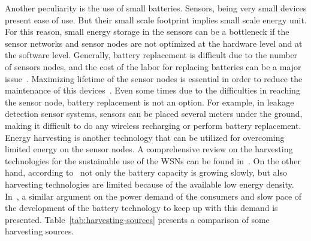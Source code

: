 \documentclass[12pt, oneandhalf, chaparabic, sees, ms]{metu}
\begin{document}
Another peculiarity is the use of small batteries.
Sensors, being very small devices present ease of use. But their small scale footprint implies small scale energy unit.
For this reason, small energy storage in the sensors can be a bottleneck if the sensor networks and sensor nodes are not optimized
at the hardware level and at the software level. Generally, battery replacement is difficult due to the number of sensors nodes, 
and the cost of the labor for replacing batteries can be a major issue~\cite{callaway2004}.
Maximizing lifetime of the sensor nodes is essential in order to reduce the maintenance of this devices~\cite[p.~13]{shelby2010}.
Even some times due to the difficulties in reaching the sensor node, battery replacement is not an option. For example, in leakage detection sensor systems, sensors can be 
placed several meters under the ground, making it difficult to do any wireless recharging or perform battery replacement.
Energy harvesting is another technology that can be utilized for overcoming limited energy on the sensor nodes. 
A comprehensive review on the harvesting technologies for the sustainable use of the WSNs can be found in~\cite{panda2010, akbari2014, panatik2016, shaikh2016}.
On the other hand, according to~\cite{thiele2018} not only the battery capacity is growing slowly, but also harvesting technologies are 
limited because of the available low energy density. In~\cite{ditzel2007}, a similar argument on the power demand of the consumers 
and slow pace of the development of the battery technology to keep up with this demand is presented. 
Table~\ref{tab:harvesting-sources} presents a comparison of some harvesting sources.
\end{document}
